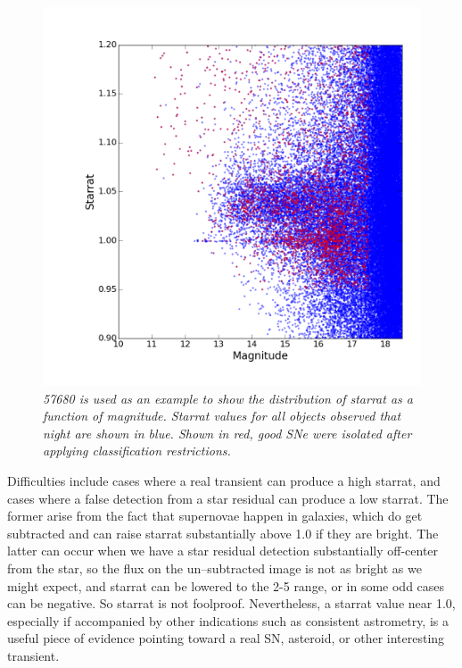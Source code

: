 \documentclass[aps,prb,twocolumn,superscriptaddress]{revtex4-1}
\begin{document}
\begin{figure}[h!]%
\begin{center}
    \includegraphics[width=1\linewidth]{figures/Starrat_mag_low_alpha0tac5_remake.png}%
     \caption{\it \small{57680 is used as an example to show the distribution of starrat as a function of magnitude.  Starrat values for all objects observed that night are shown in blue.  Shown in red, good SNe were isolated after applying classification restrictions.~\label{fig:starrat}}}
  \end{center}
\end{figure}

Difficulties include cases where a real transient can produce a high 
starrat, and cases where a false detection from a star residual can 
produce a low starrat. The former arise from the fact that supernovae 
happen in galaxies, which do get subtracted and can raise starrat 
substantially above 1.0 if they are bright. The latter can occur when 
we have a star residual detection substantially off-center from the 
star, so the flux on the un--subtracted image is not as bright as we might 
expect, and starrat can be lowered to the 2-5 range, or in some odd 
cases can be negative. So starrat is not foolproof. Nevertheless, a 
starrat value near 1.0, especially if accompanied by other indications 
such as consistent astrometry, is a useful piece of evidence pointing 
toward a real SN, asteroid, or other interesting transient.
\end{document}

